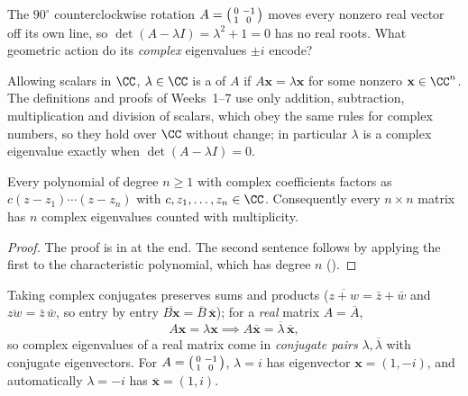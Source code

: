 \documentclass[10pt]{scrartcl}
\newcommand{\vv}[1]{\mathbf{#1}}
\begin{document}
\begin{qbox}
  The $90^\circ$ counterclockwise rotation $A=\begin{psmallmatrix}0&-1\\1&0\end{psmallmatrix}$ moves every nonzero real vector off its own line, so $\det(A-\lambda I)=\lambda^2+1=0$ has no real roots. What geometric action do its \emph{complex} eigenvalues $\pm i$ encode?
\end{qbox}

Allowing scalars in $\CC$, $\lambda\in\CC$ is a  of $A$ if $A\vv x=\lambda\vv x$ for some nonzero $\vv x\in\CC^n$. The definitions and proofs of Weeks~1--7 use only addition, subtraction, multiplication and division of scalars, which obey the same rules for complex numbers, so they hold over $\CC$ without change; in particular $\lambda$ is a complex eigenvalue exactly when $\det(A-\lambda I)=0$.

\begin{theorem*}
  Every polynomial of degree $n\ge1$ with complex coefficients factors as $c(z-z_1)\cdots(z-z_n)$ with $c,z_1,\dots,z_n\in\CC$. Consequently every $n\times n$ matrix has $n$ complex eigenvalues counted with multiplicity.
\end{theorem*}
\begin{proof}
  The proof is in  at the end. The second sentence follows by applying the first to the characteristic polynomial, which has degree $n$ ().
\end{proof}

Taking complex conjugates preserves sums and products ($\overline{z+w}=\bar z+\bar w$ and $\overline{zw}=\bar z\,\bar w$, so entry by entry $\overline{B\vv x}=\overline{B}\,\overline{\vv x}$); for a \emph{real} matrix $A=\overline{A}$,
\[
  A\vv x=\lambda\vv x \implies A\overline{\vv x}=\overline{\lambda}\,\overline{\vv x},
\]
so complex eigenvalues of a real matrix come in \emph{conjugate pairs} $\lambda,\overline{\lambda}$ with conjugate eigenvectors. For $A=\begin{psmallmatrix}0&-1\\1&0\end{psmallmatrix}$, $\lambda=i$ has eigenvector $\vv x=(1,-i)$, and automatically $\lambda=-i$ has $\overline{\vv x}=(1,i)$.
\end{document}
